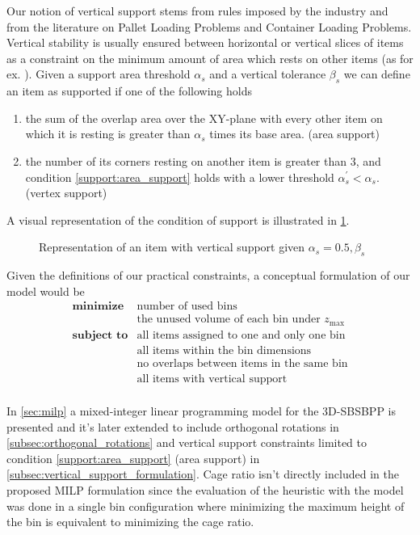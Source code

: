 Our notion of vertical support stems from rules imposed by the industry and from the literature on Pallet Loading Problems and Container Loading Problems. Vertical stability is usually ensured between horizontal or vertical slices of items as a constraint on the minimum amount of area which rests on other items (as for ex. \citep{elhedhli2019three,kurpel2020exact,paquay2016mixed}).
Given a support area threshold $\alpha_s$ and a vertical tolerance $\beta_s$ we can define an item as supported if one of the following holds
\begin{enumerate}
    \item the sum of the overlap area over the XY-plane with every other item on which it is resting is greater than $\alpha_s$ times its base area. (area support) \label{support:area_support}
    \item the number of its corners resting on another item is greater than 3, and condition \ref{support:area_support} holds with a lower threshold $\alpha^\prime_s < \alpha_s$. (vertex support) \label{support:vertex_support}
\end{enumerate}
A visual representation of the condition of support is illustrated in \cref{fig:support}.

\begin{figure}[H]
    \scalebox{0.55}{%
    
    }
    \caption{Representation of an item with vertical support given $\alpha_s = 0.5, \beta_s$}
    \label{fig:support}
\end{figure}

\newpage
Given the definitions of our practical constraints, a conceptual formulation of our model would be
\begin{eqnarray*}
    \textbf{minimize} & \text{number of used bins} \\
                        & \text{the unused volume of each bin under $z_\text{max}$} \\
    \textbf{subject to} & \text{all items assigned to one and only one bin} \\
                                      & \text{all items within the bin dimensions} \\
                                      & \text{no overlaps between items in the same bin} \\
                                      & \text{all items with vertical support} \\
\end{eqnarray*}

In \cref{sec:milp} a mixed-integer linear programming model for the 3D-SBSBPP is presented and it's later extended to include orthogonal rotations in \cref{subsec:orthogonal_rotations} and vertical support constraints limited to condition \ref{support:area_support} (area support) in \cref{subsec:vertical_support_formulation}.
Cage ratio isn't directly included in the proposed MILP formulation since the evaluation of the heuristic with the model was done in a single bin configuration where minimizing the maximum height of the bin is equivalent to minimizing the cage ratio.

